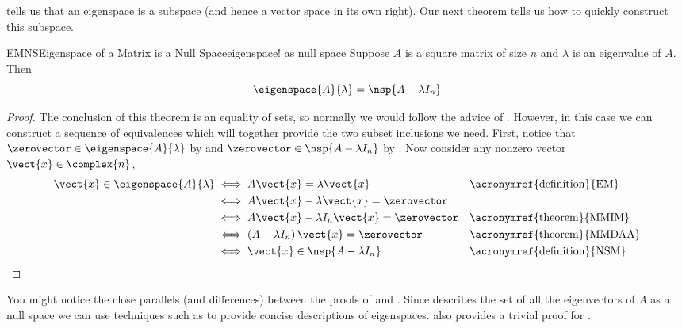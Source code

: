 %
 tells us that an eigenspace is a subspace (and hence a vector space in its own right).  Our next theorem tells us how to quickly construct this subspace.
%
\begin{theorem}{EMNS}{Eigenspace of a Matrix is a Null Space}{eigenspace! as null space}
Suppose  $A$ is a square matrix of size $n$ and $\lambda$ is an eigenvalue of $A$.  Then 
%
\begin{equation*}
\eigenspace{A}{\lambda}=\nsp{A-\lambda I_n}
\end{equation*}
%
\end{theorem}
%
\begin{proof}
The conclusion of this theorem is an equality of sets, so normally we would follow the advice of .  However, in this case we can construct a sequence of equivalences which will together provide the two subset inclusions we need.  First, notice that $\zerovector\in\eigenspace{A}{\lambda}$ by  and $\zerovector\in\nsp{A-\lambda I_n}$ by .  Now consider any nonzero vector $\vect{x}\in\complex{n}$,
%
\begin{align*}
\vect{x}\in\eigenspace{A}{\lambda}&\iff A\vect{x}=\lambda\vect{x}&&\text{\acronymref{definition}{EM}}\\
&\iff A\vect{x}-\lambda\vect{x}=\zerovector\\
&\iff A\vect{x}-\lambda I_n\vect{x}=\zerovector&&\text{\acronymref{theorem}{MMIM}}\\
&\iff\left(A-\lambda I_n\right)\vect{x}=\zerovector&&\text{\acronymref{theorem}{MMDAA}}\\
&\iff\vect{x}\in\nsp{A-\lambda I_n}&&\text{\acronymref{definition}{NSM}}
\end{align*}
%
\end{proof}
%
You might notice the close parallels (and differences) between the proofs of  and .  Since  describes the set of all the eigenvectors of $A$ as a null space we can use techniques such as  to provide concise descriptions of eigenspaces.   also provides a trivial proof for .
%
